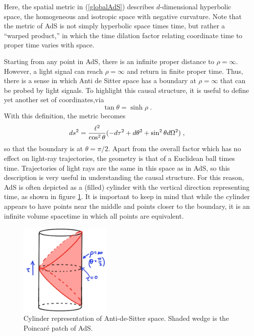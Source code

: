 \documentclass[12pt,epsf]{article}
\newcommand{\be}{\begin{equation}}
\newcommand{\ee}{\end{equation}}
\begin{document}
Here, the spatial metric in (\ref{globalAdS}) describes $d$-dimensional hyperbolic space, the homogeneous and isotropic space with negative curvature. Note that the metric of AdS is not simply hyperbolic space times time, but rather a ``warped product,'' in which the time dilation factor relating coordinate time to proper time varies with space.

Starting from any point in AdS, there is an infinite proper distance to $\rho=\infty$. However, a light signal can reach $\rho = \infty$ and return in finite proper time. Thus, there is a sense in which Anti de Sitter space has a boundary at $\rho = \infty$ that can be probed by light signals. To highlight this causal structure, it is useful to define yet another set of coordinates,via
\be
\tan \theta = \sinh \rho \; .
\ee
With this definition, the metric becomes
\be
\label{can}
ds^2 = {\ell^2 \over \cos^2 \theta}(-d \tau^2 + d \theta^2 + \sin^2 \theta d \Omega^2) \; ,
\ee
so that the boundary is at $\theta = \pi/2$.  Apart from the overall factor which has no effect on light-ray trajectories, the geometry is that of a Euclidean ball times time. Trajectories of light rays are the same in this space as in AdS, so this description is very useful in understanding the causal structure.  For this reason, AdS is often depicted as a (filled) cylinder with the vertical direction representing time, as shown in figure \ref{figAds}. It is important to keep in mind that while the cylinder appears to have points near the middle and points closer to the boundary, it is an infinite volume spacetime in which all points are equivalent.

\begin{figure}
\centering
\includegraphics[width=0.4\textwidth]{picAdS.eps}
\caption{Cylinder representation of Anti-de-Sitter space. Shaded wedge is the Poincar\'e patch of AdS.}
\label{figAds}
\end{figure}
\end{document}
